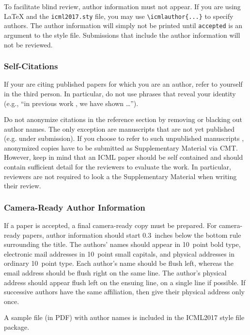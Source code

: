 \documentclass{article}
\begin{document}
To facilitate blind review, author information must not appear.  If
you are using \LaTeX\/ and the \texttt{icml2017.sty} file, you may use
\verb+\icmlauthor{...}+ to specify authors.  The author information
will simply not be printed until {\tt accepted} is an argument to the
style file. Submissions that include the author information will not
be reviewed.

\subsubsection{Self-Citations}

If your are citing published papers for which you are an author, refer
to yourself in the third person. In particular, do not use phrases
that reveal your identity (e.g., ``in previous work \cite{langley00}, we 
have shown \ldots'').

Do not anonymize citations in the reference section by removing or
blacking out author names. The only exception are manuscripts that are
not yet published (e.g. under submission). If you choose to refer to
such unpublished manuscripts \cite{anonymous}, anonymized copies have 
to be submitted
as Supplementary Material via CMT. However, keep in mind that an ICML
paper should be self contained and should contain sufficient detail
for the reviewers to evaluate the work. In particular, reviewers are
not required to look a the Supplementary Material when writing their
review.

\subsubsection{Camera-Ready Author Information}
\label{final author}

If a paper is accepted, a final camera-ready copy must be prepared.
%
For camera-ready papers, author information should start 0.3~inches
below the bottom rule surrounding the title. The authors' names should
appear in 10~point bold type, electronic mail addresses in 10~point
small capitals, and physical addresses in ordinary 10~point type.
Each author's name should be flush left, whereas the email address
should be flush right on the same line. The author's physical address
should appear flush left on the ensuing line, on a single line if
possible. If successive authors have the same affiliation, then give
their physical address only once.

A sample file (in PDF) with author names is included in the ICML2017 
style file package.
\end{document}
